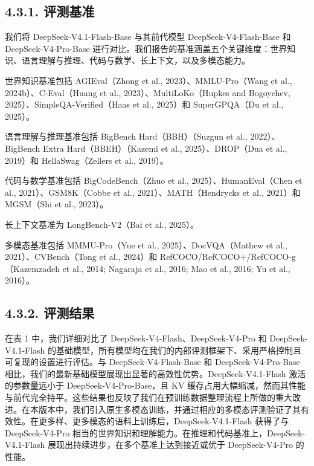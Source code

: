 \subsection{4.3.1. 评测基准}\label{evaluation-benchmarks}

我们将 DeepSeek-V4.1-Flash-Base 与其前代模型 DeepSeek-V4-Flash-Base 和 DeepSeek-V4-Pro-Base 进行对比。我们报告的基准涵盖五个关键维度：世界知识、语言理解与推理、代码与数学、长上下文，以及多模态能力。

世界知识基准包括 AGIEval（Zhong et al., 2023）、MMLU-Pro（Wang et al., 2024b）、C-Eval（Huang et al., 2023）、MultiLoKo（Hupkes and Bogoychev, 2025）、SimpleQA-Verified（Haas et al., 2025）和 SuperGPQA（Du et al., 2025）。

语言理解与推理基准包括 BigBench Hard（BBH）（Suzgun et al., 2022）、BigBench Extra Hard（BBEH）（Kazemi et al., 2025）、DROP（Dua et al., 2019）和 HellaSwag（Zellers et al., 2019）。

代码与数学基准包括 BigCodeBench（Zhuo et al., 2025）、HumanEval（Chen et al., 2021）、GSM8K（Cobbe et al., 2021）、MATH（Hendrycks et al., 2021）和 MGSM（Shi et al., 2023）。

长上下文基准为 LongBench-V2（Bai et al., 2025）。

多模态基准包括 MMMU-Pro（Yue et al., 2025）、DocVQA（Mathew et al., 2021）、CVBench（Tong et al., 2024）和 RefCOCO/RefCOCO+/RefCOCO-g（Kazemzadeh et al., 2014; Nagaraja et al., 2016; Mao et al., 2016; Yu et al., 2016）。

\subsection{4.3.2. 评测结果}\label{evaluation-results}

在表 1 中，我们详细对比了 DeepSeek-V4-Flash、DeepSeek-V4-Pro 和 DeepSeek-V4.1-Flash 的基础模型，所有模型均在我们的内部评测框架下、采用严格控制且可复现的设置进行评估。与 DeepSeek-V4-Flash-Base 和 DeepSeek-V4-Pro-Base 相比，我们的最新基础模型展现出显著的高效性优势。DeepSeek-V4.1-Flash 激活的参数量远小于 DeepSeek-V4-Pro-Base，且 KV 缓存占用大幅缩减，然而其性能与前代完全持平。这些结果也反映了我们在预训练数据整理流程上所做的重大改进。在本版本中，我们引入原生多模态训练，并通过相应的多模态评测验证了其有效性。在更多样、更多模态的语料上训练后，DeepSeek-V4.1-Flash 获得了与 DeepSeek-V4-Pro 相当的世界知识和理解能力。在推理和代码基准上，DeepSeek-V4.1-Flash 展现出持续进步，在多个基准上达到接近或优于 DeepSeek-V4-Pro 的性能。



